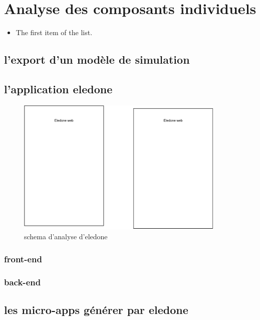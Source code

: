 \documentclass{rapport_stage}
\begin{document}
\chapter{Analyse des composants individuels}

\begin{itemize}[label=$\bullet$]
  \item The first item of the list.
\end{itemize}

\section{l'export d'un modèle de simulation}

\section{l'application eledone}

\begin{figure}[ht]
  \centering
  \includegraphics[width=10cm]{figures/eledone.pdf}
  \caption{schema d'analyse d'eledone}
  \label{fig:analyse-eledone}
\end{figure}

\subsection*{front-end}

\subsection*{back-end}

\section{les micro-apps générer par eledone}
\end{document}
